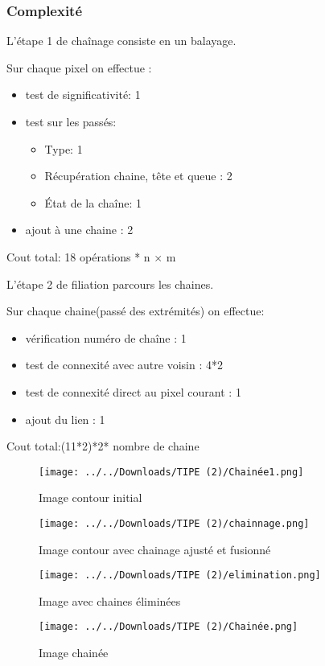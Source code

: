 \documentclass{beamer}
\begin{document}
\begin{frame}[fragile]
\frametitle{Complexité}
L'étape 1 de chaînage consiste en un balayage.

Sur chaque pixel on effectue :
\begin{itemize}
\item test de significativité: 1
\item test sur les passés:
\begin{itemize}
\item Type: 1
\item Récupération chaine, tête et queue : 2
\item État de la chaîne: 1

\end{itemize}
\item ajout à une chaine : 2
\end{itemize}

Cout total: 18 opérations * n $\times$ m

L'étape 2 de filiation parcours les chaines.

Sur chaque chaine(passé des extrémités) on effectue:
\begin{itemize}
\item vérification numéro de chaîne : 1
\item test de connexité avec autre voisin : 4*2
\item test de connexité direct au pixel courant : 1
\item ajout du lien : 1
\end{itemize}

Cout total:(11*2)*2* nombre de chaine

\end{frame}

\begin{frame}

\begin{figure}[h]
    \begin{minipage}[c]{.46\linewidth}
        \centering
        \texttt{[image: ../../Downloads/TIPE (2)/Chainée1.png]}
        \caption{Image contour initial}
    \end{minipage}
    \hfill%
    \begin{minipage}[c]{.46\linewidth}
        \centering
        \texttt{[image: ../../Downloads/TIPE (2)/chainnage.png]}
        \caption{Image contour avec chainage ajusté et fusionné}
    \end{minipage}
    \begin{minipage}[c]{.46\linewidth}
        \centering
        \texttt{[image: ../../Downloads/TIPE (2)/elimination.png]}
        \caption{Image avec chaines éliminées}
    \end{minipage}
    \hfill
    \begin{minipage}[c]{.46\linewidth}
        \centering
        \texttt{[image: ../../Downloads/TIPE (2)/Chainée.png]}
        \caption{Image chainée}
    \end{minipage}

\end{figure}
\end{frame}
\end{document}
